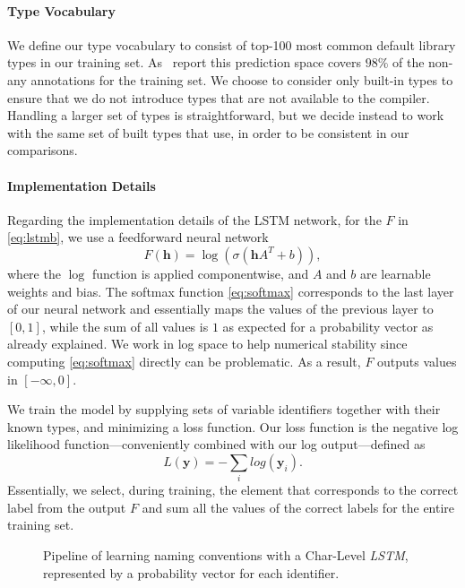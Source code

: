 \documentclass[acmsmall, review, anonymous]{acmart}\settopmatter{printfolios=true,printccs=false,printacmref=false}
\begin{document}
\paragraph{Type Vocabulary}
We define our type vocabulary to consist of top-100 most common default library types in our training set. As~\citet{wei20} report this prediction space covers $98\%$ of the non-any annotations for the training set. We choose to consider only built-in types 
to ensure that we do not introduce types that are not available to the compiler. Handling a larger set of types is straightforward, but we decide instead to work with the same set of built types that \citet{hellendoorn18, wei20} use, in order to be consistent in our comparisons.
%
\paragraph{Implementation Details}
Regarding the implementation details of the LSTM network, for the $F$ in \eqref{eq:lstmb},
we use a feedforward neural network
\begin{equation}
	F(\bm{h}) = \log\left( \sigma\left(\bm{h}A^T + b \right) \right),\label{eq:feedforward}
\end{equation}
where the $\log$ function is applied componentwise,
and $A$ and $b$ are learnable weights and bias.
The softmax function \eqref{eq:softmax} corresponds to the last layer of our neural network
and essentially maps the values of the previous layer to $[0, 1]$,
while the sum of all values is $1$ as expected for a probability vector as already explained.
We work in log space to help numerical stability since computing \eqref{eq:softmax} directly can be problematic.
As a result, $F$ outputs values in $[-\infty, 0]$.

We train the model by supplying sets of variable identifiers together with their known types,
and minimizing a loss function.
Our loss function is the negative log likelihood function---conveniently combined with our log output---defined as
\begin{equation}
	L(\bm{y}) = -\sum_i log(\bm{y}_i).
\end{equation}
Essentially, we select, during training, the element that corresponds
to the correct label from the output $F$
and sum all the values of the correct labels for the entire training set.

\begin{figure*}[!t]
    \centering
    \def\svgwidth{\linewidth}
    
  \caption{Pipeline of learning naming conventions with 
  a Char-Level \textit{LSTM}, represented by a probability vector for each identifier.
  }\label{fig:Char-Level}
\end{figure*}
\end{document}
